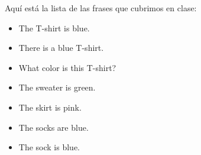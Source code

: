 Aqu\'i est\'a la lista de las frases que cubrimos en clase:
\begin{itemize}
	\item The T-shirt is blue. \arr {}
	\item There is a blue T-shirt. \arr {}
	\item What color is this T-shirt? \arr {}
	\item The sweater is green. \arr {}
	\item The skirt is pink. \arr {}
	\item The socks are blue. \arr {}
	\item The sock is blue. \arr {}
\end{itemize}


